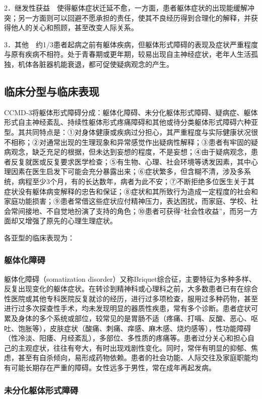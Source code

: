 2．继发性获益　使得躯体症状迁延不愈，一方面，患者躯体症状的出现能缓解冲突；另一方面则可以回避不愿承担的责任，使其不良经历得到合理化的解释，并获得他人的关心和照顾，甚至改变人际关系。

3．其他　约1/3患者起病之前有躯体疾病，但躯体形式障碍的表现及症状严重程度与原有疾病不相符。处于青春期或更年期，较易出现自主神经症状，老年人生活孤独，机体各脏器机能衰退，都可促使疑病观念的产生。

\subsection{临床分型与临床表现}

CCMD-3将躯体形式障碍分成：躯体化障碍、未分化躯体形式障碍、疑病症、躯体形式自主神经紊乱、持续性躯体形式疼痛障碍和其他或待分类躯体形式障碍六种亚型。其共同特点是：①对身体健康或疾病过分担心，其严重程度与实际健康状况很不相称；②对通常出现的生理现象和异常感觉作出疑病性解释；③患者有牢固的疑病观念，缺乏充足的根据，但未达到妄想的程度，不是妄想；④由于疑病观念，患者反复就医或反复要求医学检查；⑤有生物、心理、社会环境等诱发因素，其中心理因素在医生启发下可能会充分暴露出来；⑥症状繁多，但含糊不清，涉及多系统，病程至少3个月，有的长达数年，病者为此不安；⑦不断拒绝多位医生关于其症状没有躯体病变解释的忠告和保证；⑧症状和其所致行为造成一定程度的社会和家庭功能损害；⑨患者常借这些症状应付精神压力，表达困扰，而家庭、学校、社会常间接地、不自觉地扮演了支持的角色；⑩患者可获得“社会性收益”，而另一方面却又增强了原先的心理生理症状。

各亚型的临床表现为：

\subsubsection{躯体化障碍}

躯体化障碍（somatization
disorder）又称Briquet综合征，主要特征为多种多样、反复出现变化的躯体症状。在转诊到精神科或心理科之前，大多数患者已有在综合性医院或其他专科医院反复就诊的经历，进行过多项检查，服用过多种药物，甚至进行过多次探查性手术，均未发现明显的器质性疾患，常有多个诊断。患者症状可累及身体的多个系统或部位，较常见的是胃肠不适（疼痛、打嗝、反酸、恶心、呕吐、饱胀等），皮肤症状（酸痛、刺痛、痒感、麻木感、烧灼感等），性功能障碍（性冷淡、阳痿、月经紊乱），多部位、多性质的疼痛等。患者过分关心和担心自己的主观症状，往往有夸大，有时出现戏剧性变化。同时，常伴有明显的抑郁、焦虑，甚至有自杀倾向，易形成药物依赖。患者的社会功能、人际交往及家庭职能均有可能长期存在严重的障碍。女性远多于男性，常在成年再起发病。

\subsubsection{未分化躯体形式障碍}

